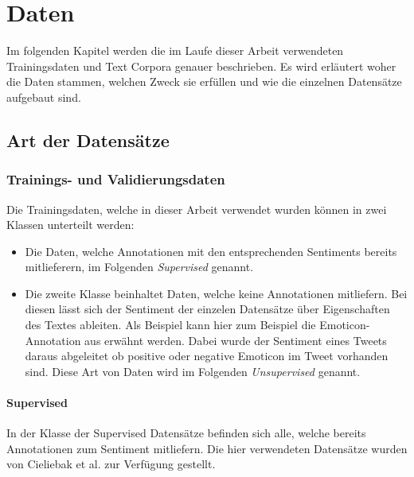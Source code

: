 \chapter{Daten}
Im  folgenden Kapitel werden die im Laufe dieser Arbeit verwendeten Trainingsdaten und Text Corpora genauer beschrieben. Es wird erläutert woher die Daten stammen, welchen Zweck sie erfüllen und wie die einzelnen Datensätze aufgebaut sind.

\section{Art der Datensätze}
\subsection{Trainings- und Validierungsdaten}
Die Trainingsdaten, welche in dieser Arbeit verwendet wurden können in zwei Klassen unterteilt werden:

\begin{itemize}
	\item Die Daten, welche Annotationen mit den entsprechenden Sentiments bereits mitlieferern, im Folgenden \emph{Supervised} genannt.
	\item Die zweite Klasse beinhaltet Daten, welche keine Annotationen mitliefern. Bei diesen lässt sich der Sentiment der einzelen Datensätze über Eigenschaften des Textes ableiten. Als Beispiel kann hier zum Beispiel die Emoticon-Annotation aus \cite{deriu2016sentiment} erwähnt werden. Dabei wurde der Sentiment eines Tweets daraus abgeleitet ob positive oder negative Emoticon im Tweet vorhanden sind. Diese Art von Daten wird im Folgenden \emph{Unsupervised} genannt.
\end{itemize}

\clearpage

\subsubsection{Supervised}
\label{data:supervised_data}
In der Klasse der Supervised Datensätze befinden sich alle, welche bereits Annotationen zum Sentiment mitliefern. Die hier verwendeten Datensätze wurden von Cieliebak et al. \cite{cieliebak2013potential} zur Verfügung gestellt.\\

